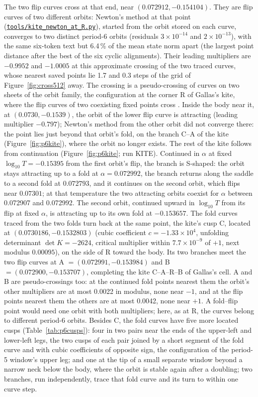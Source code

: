 \documentclass[11pt,letterpaper]{article}
\newcommand{\repourl}{https://github.com/tdj28/neural-shrimp}
\newcommand{\reporef}{arxiv-v1}
\newcommand{\repo}[1]{\href{\repourl/blob/\reporef/#1}{\nolinkurl{#1}}}
\begin{document}
The two flip curves cross at that end, near $(0.072912,-0.154104)$. They are flip curves of two different orbits:
Newton's method at that point (\repo{tools/kite_newton_at_R.py}), started from the orbit stored on each curve, converges
to two distinct period-6 orbits (residuals $3\times10^{-14}$ and $2\times10^{-13}$), with the same six-token text but
6.4\,\% of the mean state norm apart (the largest point distance after the best of the six cyclic alignments). Their
leading multipliers are $-0.9952$ and $-1.0005$ at this approximate crossing of the two traced curves, whose nearest
saved points lie 1.7 and 0.3 steps of the grid of Figure~\ref{fig:cross512} away. The crossing is a
pseudo-crossing of curves on two sheets of the orbit family, the configuration at the corner R of Gallas's kite, where
the flip curves of two coexisting fixed points cross \cite[Fig.~7]{gallas1994dissecting}. Inside the body near it, at
$(0.0730,-0.1539)$, the orbit of the lower flip curve is attracting (leading multiplier $-0.797$); Newton's method from
the other orbit did not converge there: the point lies just beyond that orbit's fold, on the branch C--A of the kite
(Figure~\ref{fig:p6kite}), where the orbit no longer exists. The rest of the kite
follows from continuation (Figure~\ref{fig:p6kite}; run KITE). Continued in $\alpha$ at fixed $\log_{10}T=-0.15395$ from
the first orbit's flip, the branch is S-shaped: the orbit stays attracting up to a fold at $\alpha=0.072992$, the
branch returns along the saddle to a second fold at $0.072793$, and it continues on the second orbit, which flips near
$0.07301$; at that temperature the two attracting orbits coexist for $\alpha$ between 0.072907 and 0.072992. The second
orbit, continued upward in $\log_{10}T$ from its flip at fixed $\alpha$, is attracting up to its own fold at
$-0.153657$. The fold curves traced from the two folds turn back at the same point, the kite's cusp C, located at
$(0.0730186,-0.1532803)$ (cubic coefficient $c=-1.33\times10^{4}$, unfolding determinant $\det K=-2624$, critical
multiplier within $7.7\times10^{-9}$ of $+1$, next modulus $0.00095$), on the side of R toward the body. Its two
branches meet the two flip curves at A $=(0.072991,-0.153984)$ and B $=(0.072900,-0.153707)$, completing the kite C--A--R--B of Gallas's cell. A and B are pseudo-crossings too: at the continued fold points
nearest them the orbit's other multipliers are at most 0.0022 in modulus, none near $-1$, and at the flip points nearest
them the others are at most 0.0042, none near $+1$. A fold--flip point would need one orbit with both multipliers; here,
as at R, the curves belong to different period-6 orbits. Besides C,
the fold curves have five more located cusps (Table~\ref{tab:p6cusps}): four in two pairs near the ends of the upper-left and lower-left legs, the two cusps of each pair joined by a short
segment of the fold curve and with cubic coefficients of opposite sign, the configuration of the period-5
window's upper leg; and one at the tip of a small separate window beyond a narrow neck below the body, where the orbit
is stable again after a doubling; two branches, run independently, trace that fold curve and its turn to within one
curve step.
\end{document}
